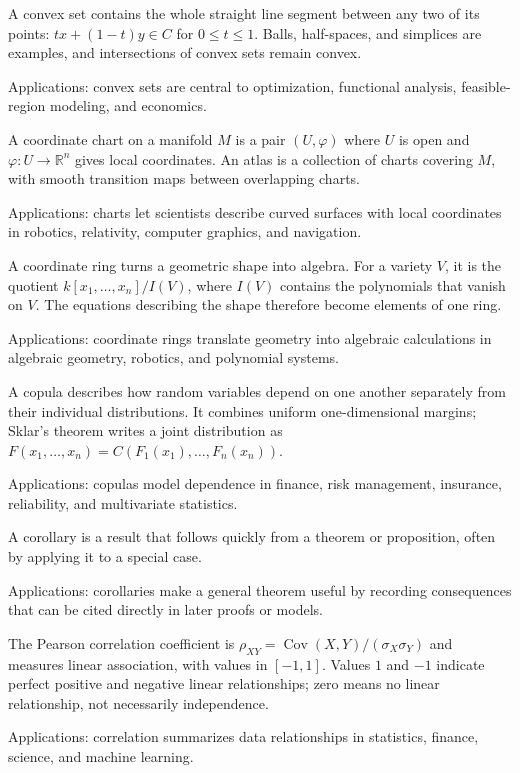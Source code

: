 A convex set contains the whole straight line segment between any two of its points: $tx+(1-t)y\in C$ for $0\le t\le1$. Balls, half-spaces, and simplices are examples, and intersections of convex sets remain convex. \par\noindent Applications: convex sets are central to optimization, functional analysis, feasible-region modeling, and economics.

A coordinate chart on a manifold $M$ is a pair $(U,\varphi)$ where $U$ is open and $\varphi:U\to\mathbb R^n$ gives local coordinates. An atlas is a collection of charts covering $M$, with smooth transition maps between overlapping charts. \par\noindent Applications: charts let scientists describe curved surfaces with local coordinates in robotics, relativity, computer graphics, and navigation.

A coordinate ring turns a geometric shape into algebra. For a variety $V$, it is the quotient $k[x_1,\ldots,x_n]/I(V)$, where $I(V)$ contains the polynomials that vanish on $V$. The equations describing the shape therefore become elements of one ring. \par\noindent Applications: coordinate rings translate geometry into algebraic calculations in algebraic geometry, robotics, and polynomial systems.

A copula describes how random variables depend on one another separately from their individual distributions. It combines uniform one-dimensional margins; Sklar's theorem writes a joint distribution as $F(x_1,\ldots,x_n)=C(F_1(x_1),\ldots,F_n(x_n))$. \par\noindent Applications: copulas model dependence in finance, risk management, insurance, reliability, and multivariate statistics.

A corollary is a result that follows quickly from a theorem or proposition, often by applying it to a special case. \par\noindent Applications: corollaries make a general theorem useful by recording consequences that can be cited directly in later proofs or models.

The Pearson correlation coefficient is $\rho_{XY}=\operatorname{Cov}(X,Y)/(\sigma_X\sigma_Y)$ and measures linear association, with values in $[-1,1]$. Values $1$ and $-1$ indicate perfect positive and negative linear relationships; zero means no linear relationship, not necessarily independence. \par\noindent Applications: correlation summarizes data relationships in statistics, finance, science, and machine learning.

